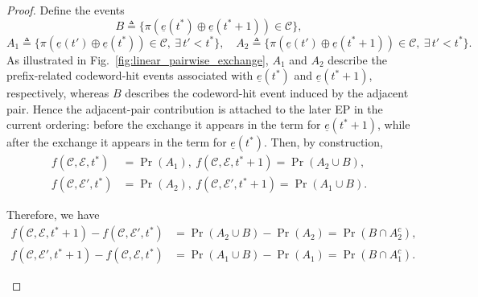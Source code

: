 \documentclass[letterpaper,draftclsnofoot,onecolumn]{IEEEtran}
\begin{document}
\begin{proof}
Define the events
\begin{equation}
B \triangleq \{\pi(\underline{e}(t^{*})\oplus \underline{e}(t^{*}+1))\in\mathcal{C}\},
\end{equation}
\begin{equation}
A_1 \triangleq \{\pi(\underline{e}(t')\oplus \underline{e}(t^{*}))\in\mathcal{C},\ \exists\, t'<t^{*}\},\quad
A_2 \triangleq \{\pi(\underline{e}(t')\oplus \underline{e}(t^{*}+1))\in\mathcal{C},\ \exists\, t'<t^{*}\}.
\end{equation}
As illustrated in Fig.~\ref{fig:linear_pairwise_exchange}, $A_1$ and $A_2$ describe the prefix-related codeword-hit events associated with $\underline{e}(t^{*})$ and $\underline{e}(t^{*}+1)$, respectively, whereas $B$ describes the codeword-hit event induced by the adjacent pair. Hence the adjacent-pair contribution is attached to the later EP in the current ordering: before the exchange it appears in the term for $\underline{e}(t^{*}+1)$, while after the exchange it appears in the term for $\underline{e}(t^{*})$.
Then, by construction,
\begin{align}
    f(\mathcal{C},\mathcal{E},t^{*}) &= \Pr(A_1),\ f(\mathcal{C},\mathcal{E},t^{*}+1) = \Pr(A_2 \cup B), \\
    f(\mathcal{C},\mathcal{E}',t^{*}) &= \Pr(A_2),\ f(\mathcal{C},\mathcal{E}',t^{*}+1) = \Pr(A_1 \cup B).
\end{align}

Therefore, we have
\begin{align}
    f(\mathcal{C},\mathcal{E},t^{*}+1)-f(\mathcal{C},\mathcal{E}',t^{*})
    &= \Pr(A_2\cup B)-\Pr(A_2) = \Pr(B\cap A_2^c), \label{eq:th_7_clean_2} \\
    f(\mathcal{C},\mathcal{E}',t^{*}+1)-f(\mathcal{C},\mathcal{E},t^{*})
    &= \Pr(A_1\cup B)-\Pr(A_1) = \Pr(B\cap A_1^c). \label{eq:th_7_clean_3}
\end{align}

\begin{figure}[t]
\centering
{}
\end{figure}
\end{proof}
\end{document}
